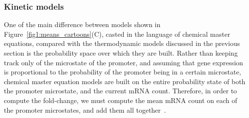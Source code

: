 \subsubsection{Kinetic models}
One of the main difference between models shown in
Figure~\ref{fig1:means_cartoons}(C), casted in the language of chemical master
equations, compared with the thermodynamic models discussed in the previous 
section is the probability space over which they are built. Rather than keeping
track only of the microstate of the promoter, and assuming that gene expression
is proportional to the probability of the promoter being in a certain
microstate, chemical master equation models are built on the entire probability
state of both the promoter microstate, and the current mRNA count. Therefore, in
order to compute the fold-change, we must compute the mean mRNA count on each of
the promoter microstates, and add them all together~\cite{Sanchez2013}.

